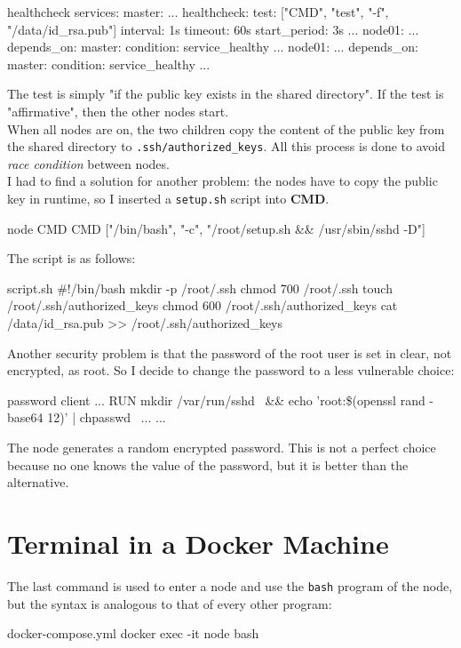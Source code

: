 \begin{codice}[style=bashstyle]{healthcheck}
services: 
  master:
    ...
    healthcheck:
      test: ["CMD", "test", "-f", "/data/id_rsa.pub"]
      interval: 1s
      timeout: 60s
      start_period: 3s
  ...
  node01:
    ...
    depends_on:
      master:
        condition: service_healthy
  ...
  node01:
    ...
    depends_on:
      master:
        condition: service_healthy
...
\end{codice} 

The test is simply "if the public key exists in the shared directory". If the test is "affirmative", then the other nodes start. \\
When all nodes are on, the two children copy the content of the public key from the shared directory to \texttt{.ssh/authorized\_keys}. All this process is done to avoid \textit{race condition} between nodes. \\
I had to find a solution for another problem: the nodes have to copy the public key in runtime, so I inserted a \texttt{setup.sh} script into \textbf{CMD}.

\begin{codice}[style=bashstyle]{node CMD}
CMD ["/bin/bash", "-c", "/root/setup.sh && /usr/sbin/sshd -D"]
\end{codice}

The script is as follows:

\begin{codice}[style=bashstyle]{script.sh}
#!/bin/bash
mkdir -p /root/.ssh
chmod 700 /root/.ssh
touch /root/.ssh/authorized_keys
chmod 600 /root/.ssh/authorized_keys
cat /data/id_rsa.pub >> /root/.ssh/authorized_keys
\end{codice}

Another security problem is that the password of the root user is set in clear, not encrypted, as root. So I decide to change the password to a less vulnerable choice:

\begin{codice}[style=bashstyle]{password client}
...
RUN mkdir /var/run/sshd \
    && echo 'root:\$(openssl rand -base64 12)' | chpasswd \
    ...
...
\end{codice}

The node generates a random encrypted password. This is not a perfect choice because no one knows the value of the password, but it is better than the alternative. 

\section{Terminal in a Docker Machine}

The last command is used to enter a node and use the \texttt{bash} program of the node, but the syntax is analogous to that of every other program:

\begin{codice}[style=bashstyle]{docker-compose.yml}
docker exec -it node bash
\end{codice}
